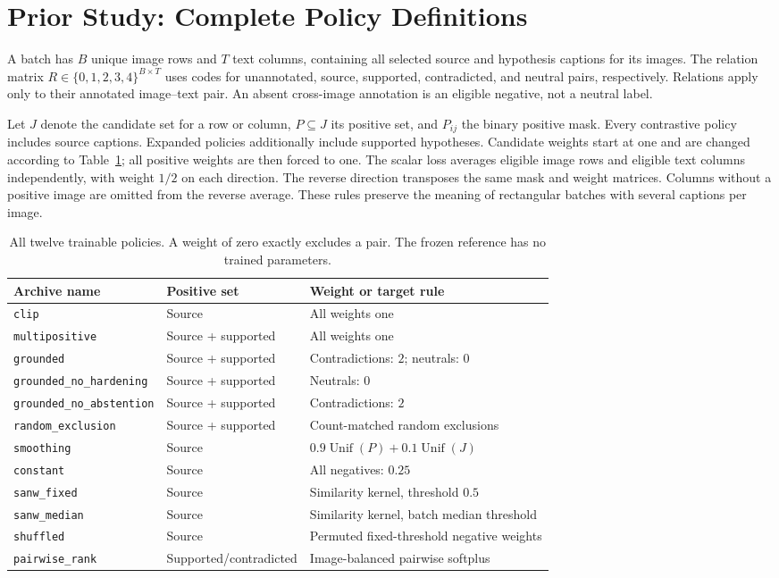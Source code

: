 \section{Prior Study: Complete Policy Definitions}
\label{app:policies}
A batch has $B$ unique image rows and $T$ text columns, containing all selected source and hypothesis captions for its images. The relation matrix $R\in\{0,1,2,3,4\}^{B\times T}$ uses codes for unannotated, source, supported, contradicted, and neutral pairs, respectively. Relations apply only to their annotated image--text pair. An absent cross-image annotation is an eligible negative, not a neutral label.

Let $J$ denote the candidate set for a row or column, $P\subseteq J$ its positive set, and $P_{ij}$ the binary positive mask. Every contrastive policy includes source captions. Expanded policies additionally include supported hypotheses. Candidate weights start at one and are changed according to Table~\ref{tab:policies}; all positive weights are then forced to one. The scalar loss averages eligible image rows and eligible text columns independently, with weight $1/2$ on each direction. The reverse direction transposes the same mask and weight matrices. Columns without a positive image are omitted from the reverse average. These rules preserve the meaning of rectangular batches with several captions per image.

\begin{table}[t]
\centering
\setlength{\tabcolsep}{3.5pt}
\begin{tabular}{lll}
\toprule
Archive name & Positive set & Weight or target rule\\
\midrule
\texttt{clip} & Source & All weights one\\
\texttt{multipositive} & Source + supported & All weights one\\
\texttt{grounded} & Source + supported & Contradictions: $2$; neutrals: $0$\\
\texttt{grounded\_no\_hardening} & Source + supported & Neutrals: $0$\\
\texttt{grounded\_no\_abstention} & Source + supported & Contradictions: $2$\\
\texttt{random\_exclusion} & Source + supported & Count-matched random exclusions\\
\texttt{smoothing} & Source & $0.9\operatorname{Unif}(P)+0.1\operatorname{Unif}(J)$\\
\texttt{constant} & Source & All negatives: $0.25$\\
\texttt{sanw\_fixed} & Source & Similarity kernel, threshold $0.5$\\
\texttt{sanw\_median} & Source & Similarity kernel, batch median threshold\\
\texttt{shuffled} & Source & Permuted fixed-threshold negative weights\\
\texttt{pairwise\_rank} & Supported/contradicted & Image-balanced pairwise softplus\\
\bottomrule
\end{tabular}
\caption{All twelve trainable policies. A weight of zero exactly excludes a pair. The frozen reference has no trained parameters.}
\label{tab:policies}
\end{table}

